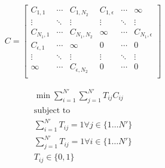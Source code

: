 \noindent
\begin{minipage}{.5\linewidth}

     \[
          C=
               \left[
               \begin{array}{ccc|ccc}
                    C_{1,1} & \dotsi & C_{1, N_2} & C_{1, \epsilon} & \dotsi & \infty \\
                    \vdots & \ddots & \vdots & \vdots & \ddots & \vdots \\
                    C_{N_1, 1} & \dotsi & C_{N_1, N_2} & \infty & \dotsi & C_{N_1, \epsilon} \\
                    \hline
                    C_{\epsilon, 1} & \dotsi & \infty & 0 & \dotsi & 0 \\
                    \vdots & \ddots & \vdots & \vdots & \ddots & \vdots \\
                    \infty & \dotsi & C_{\epsilon, N_2} & 0 & \dotsi & 0 \\
               \end{array}
               \right]
     \]

\end{minipage}%
\begin{minipage}{.5\linewidth}

     \begin{equation}
          \begin{gathered}
               \min \sum_{i = 1}^{N'} \sum_{j = 1}^{N'} T_{ij} C_{ij} \\
               \text{subject to} \\
               \sum_{i = 1}^{N'} T_{ij} = 1 \forall j \in \{1 \dots N'\} \\
               \sum_{j = 1}^{N'} T_{ij} = 1 \forall i \in \{1 \dots N'\} \\
               T_{ij} \in \{0, 1\}
          \end{gathered}
     \end{equation}

\end{minipage}



